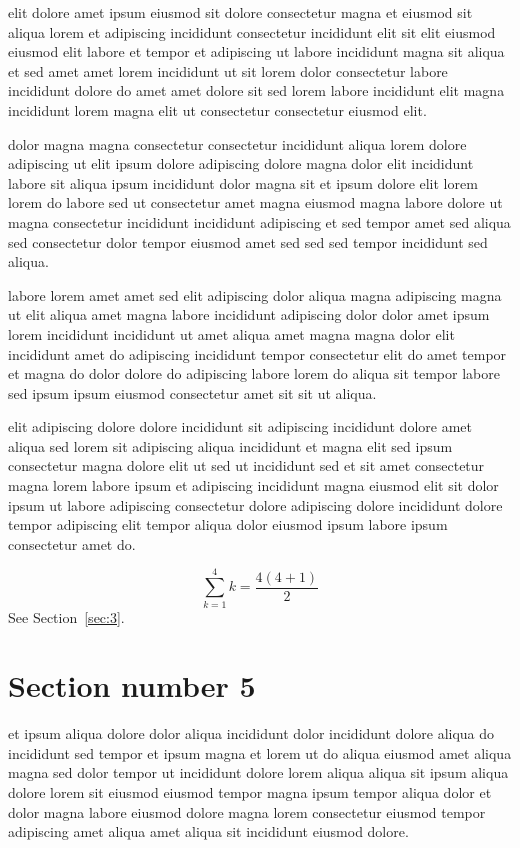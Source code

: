 \documentclass{article}
\begin{document}
elit dolore amet ipsum eiusmod sit dolore consectetur magna et eiusmod sit aliqua lorem et adipiscing incididunt consectetur incididunt elit sit elit eiusmod eiusmod elit labore et tempor et adipiscing ut labore incididunt magna sit aliqua et sed amet amet lorem incididunt ut sit lorem dolor consectetur labore incididunt dolore do amet amet dolore sit sed lorem labore incididunt elit magna incididunt lorem magna elit ut consectetur consectetur eiusmod elit.

dolor magna magna consectetur consectetur incididunt aliqua lorem dolore adipiscing ut elit ipsum dolore adipiscing dolore magna dolor elit incididunt labore sit aliqua ipsum incididunt dolor magna sit et ipsum dolore elit lorem lorem do labore sed ut consectetur amet magna eiusmod magna labore dolore ut magna consectetur incididunt incididunt adipiscing et sed tempor amet sed aliqua sed consectetur dolor tempor eiusmod amet sed sed sed tempor incididunt sed aliqua.

labore lorem amet amet sed elit adipiscing dolor aliqua magna adipiscing magna ut elit aliqua amet magna labore incididunt adipiscing dolor dolor amet ipsum lorem incididunt incididunt ut amet aliqua amet magna magna dolor elit incididunt amet do adipiscing incididunt tempor consectetur elit do amet tempor et magna do dolor dolore do adipiscing labore lorem do aliqua sit tempor labore sed ipsum ipsum eiusmod consectetur amet sit sit ut aliqua.

elit adipiscing dolore dolore incididunt sit adipiscing incididunt dolore amet aliqua sed lorem sit adipiscing aliqua incididunt et magna elit sed ipsum consectetur magna dolore elit ut sed ut incididunt sed et sit amet consectetur magna lorem labore ipsum et adipiscing incididunt magna eiusmod elit sit dolor ipsum ut labore adipiscing consectetur dolore adipiscing dolore incididunt dolore tempor adipiscing elit tempor aliqua dolor eiusmod ipsum labore ipsum consectetur amet do.

\begin{equation} \sum_{k=1}^{4} k = \frac{4(4+1)}{2} \end{equation}
See Section~\ref{sec:3}.

\section{Section number 5}\label{sec:5}
et ipsum aliqua dolore dolor aliqua incididunt dolor incididunt dolore aliqua do incididunt sed tempor et ipsum magna et lorem ut do aliqua eiusmod amet aliqua magna sed dolor tempor ut incididunt dolore lorem aliqua aliqua sit ipsum aliqua dolore lorem sit eiusmod eiusmod tempor magna ipsum tempor aliqua dolor et dolor magna labore eiusmod dolore magna lorem consectetur eiusmod tempor adipiscing amet aliqua amet aliqua sit incididunt eiusmod dolore.
\end{document}
